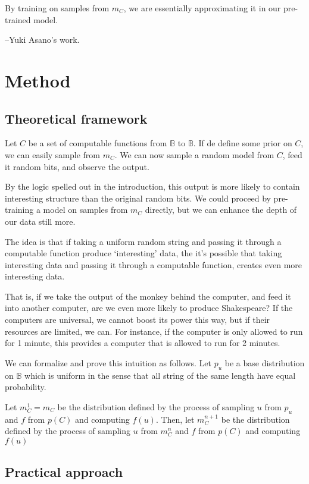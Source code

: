 \documentclass{article} %
\newcommand{\B}{\mathbb B}
\begin{document}
By training on samples from $m_C$, we are essentially approximating it in our pre-trained model.\footnotemark

--Yuki Asano's work.

\section{Method}

\subsection{Theoretical framework}

Let $C$ be a set of computable functions from $\B$ to $\B$. If de define some prior on $C$, we can easily sample from $m_C$. We can now sample a random model from $C$, feed it random bits, and observe the output.

By the logic spelled out in the introduction, this output is more likely to contain interesting structure than the original random bits. We could proceed by pre-training a model on samples from $m_C$ directly, but we can enhance the depth of our data still more. 

The idea is that if taking a uniform random string and passing it through a computable function produce `interesting' data, the it's possible that taking interesting data and passing it through a computable function, creates even more interesting data. 

That is, if we take the output of the monkey behind the computer, and feed it into another computer, are we even more likely to produce Shakespeare? If the computers are universal, we cannot boost its power this way, but if their resources are limited, we can. For instance, if the computer is only allowed to run for 1 minute, this provides a computer that is allowed to run for 2 minutes.

We can formalize and prove this intuition as follows. Let $p_u$ be a base distribution on $\B$ which is uniform in the sense that all string of the same length have equal probability.

Let $m^1_C = m_C$ be the distribution defined by the process of sampling $u$ from $p_u$ and $f$ from $p(C)$ and computing $f(u)$. Then, let $m^{n+1}_C$ be the distribution defined by the process of sampling $u$ from $m^n_C$ and $f$ from $p(C)$ and computing $f(u)$


\subsection{Practical approach}
\end{document}
